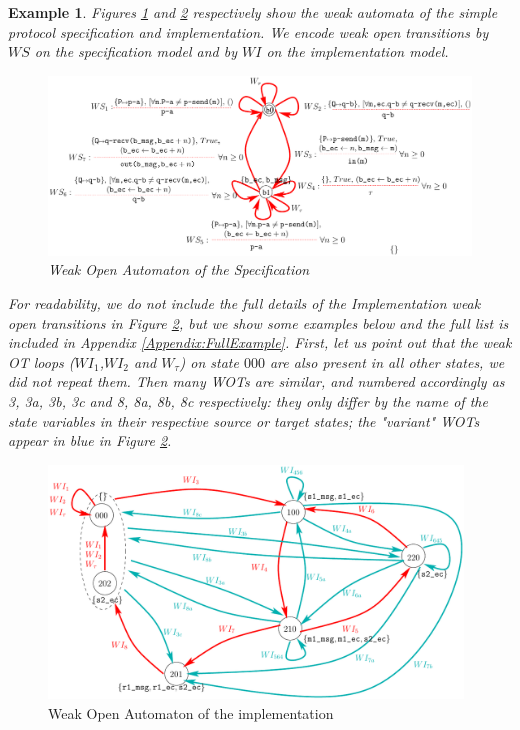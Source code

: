 \documentclass{lmcs}
\newtheorem{example}{Example}
\begin{document}
  \begin{example}
    Figures \ref{SimpleProtCounter:WeakSpecOA} and \ref{SimpleProtCounter:ImplWOA2} respectively show the weak automata of the simple protocol specification and implementation. We encode weak open transitions  by $WS$ on the specification model and by $WI$ on the implementation model.
    



\begin{figure}[h]
   \centerline{\includegraphics[width=15cm]{XFIG/SPSpecWeakOpen}}
  \caption{Weak Open Automaton of the Specification}
   \label{SimpleProtCounter:WeakSpecOA}
\end{figure}

 For readability, we do not include the full details of the Implementation weak open transitions in Figure \ref{SimpleProtCounter:ImplWOA2}, but we show some examples below and the full list is included in Appendix \ref{Appendix:FullExample}.
First, let us point out that the weak OT loops ($WI_1$,$WI_2$ and $W_\tau$) on state ${000}$ are also present in all other states, we did not repeat them. Then many WOTs are similar, and numbered accordingly as 3, 3a, 3b, 3c and 8, 8a, 8b, 8c respectively: they only differ by the name of the state variables in their respective source or target states; the "variant" WOTs appear in blue in   Figure \ref{SimpleProtCounter:ImplWOA2}.
\end{example}




\begin{figure}[h]
   \centerline{\includegraphics[width=11cm]{XFIG/SimpleProtImpl-WOA2}}
  \caption{Weak Open Automaton of the implementation}
   \label{SimpleProtCounter:ImplWOA2}
\end{figure}
\end{document}
